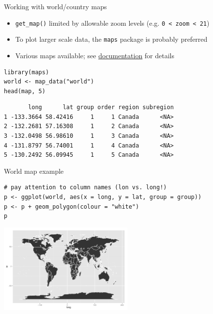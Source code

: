 \documentclass[sans,aspectratio=169,presentation,bigger,fleqn]{beamer}
\begin{document}
\begin{frame}[fragile,label=sec-10]{Working with world/country maps}
 \begin{itemize}
\item \texttt{get\_map()} limited by allowable zoom levels (e.g. \texttt{0 < zoom < 21})
\item To plot larger scale data, the \texttt{maps} package is probably preferred
\item Various maps available; see \href{http://cran.r-project.org/web/packages/maps/maps.pdf}{documentation} for details
\end{itemize}

\scriptsize
\begin{verbatim}
library(maps)
world <- map_data("world")
head(map, 5)
\end{verbatim}

\begin{verbatim}
       long      lat group order region subregion
1 -133.3664 58.42416     1     1 Canada      <NA>
2 -132.2681 57.16308     1     2 Canada      <NA>
3 -132.0498 56.98610     1     3 Canada      <NA>
4 -131.8797 56.74001     1     4 Canada      <NA>
5 -130.2492 56.09945     1     5 Canada      <NA>
\end{verbatim}
\end{frame}
\begin{frame}[fragile,label=sec-11]{World map example}
 \scriptsize
\begin{verbatim}
# pay attention to column names (lon vs. long!)
p <- ggplot(world, aes(x = long, y = lat, group = group))
p <- p + geom_polygon(colour = "white")
p
\end{verbatim}

\begin{center}
\includegraphics[height=4.5cm]{./img/world.pdf}
\end{center}

\normalsize
\end{frame}
\end{document}
